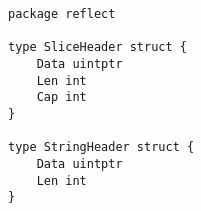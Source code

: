 \begin{lstlisting}[language=Golang, label=lst:reflect-header-types, caption=Reflect slice and string header types]
package reflect

type SliceHeader struct {
    Data uintptr
    Len int
    Cap int
}

type StringHeader struct {
    Data uintptr
    Len int
}
\end{lstlisting}